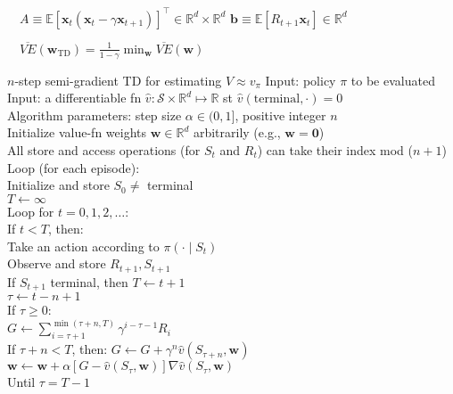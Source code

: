 \documentclass[twocolumn]{article}
\begin{document}
$\quad A \equiv \mathbb E[\mathbf x_t (\mathbf x_t - \gamma \mathbf x_{t+1})]^\top \in \mathbb R^d \times \mathbb R^d$ \hfill $\mathbf b \equiv \mathbb E[R_{t+1} \mathbf x_t] \in \mathbb R^d$

$\quad \overline{VE}(\mathbf w_{\text{TD}}) = \frac{1}{1-\gamma} \min_{\mathbf w} \overline{VE}(\mathbf w)$



\newpage

\begin{mydef}{$n$-step semi-gradient TD for estimating $V \approx v_\pi$}{}
    Input: policy $\pi$ to be evaluated \\
    Input: a differentiable fn $\hat v: \mathcal S \times \mathbb R^d \mapsto \mathbb R$ st $\hat v(\text{terminal}, \cdot) = 0$ \\
    Algorithm parameters: step size $\alpha \in (0, 1]$, positive integer $n$ \\
    Initialize value-fn weights $\mathbf w \in \mathbb R^d$ arbitrarily (e.g., $\mathbf w = \mathbf 0$) \\
    All store and access operations (for $S_t$ and $R_t$) can take their index mod ($n+1$) \\
    
    Loop (for each episode): \\
        \hspace*{2em}Initialize and store $S_0 \neq$ terminal \\
        \hspace*{2em}$T \leftarrow \infty$ \\
        \hspace*{2em}Loop for $t=0,1,2,\dots$: \\
            \hspace*{4em}If $t < T$, then: \\
                \hspace*{6em}Take an action according to $\pi(\cdot \mid S_t)$ \\
                \hspace*{6em}Observe and store $R_{t+1}, S_{t+1}$ \\
                \hspace*{6em}If $S_{t+1}$ terminal, then $T \leftarrow t+1$ \\
            \hspace*{4em}$\tau \leftarrow t-n+1$ \\
            \hspace*{4em}If $\tau \geq 0$: \\
                \hspace*{6em}$G \leftarrow \sum_{i=\tau+1}^{\min (\tau+n, T)} \gamma^{i-\tau-1} R_i$ \\
                \hspace*{6em}If $\tau + n < T$, then: $G \leftarrow G + \gamma^n \hat v(S_{\tau+n}, \mathbf w)$ \\
                \hspace*{6em}$\mathbf w \leftarrow \mathbf w + \alpha [G-\hat v(S_\tau, \mathbf w)] \nabla \hat v(S_\tau, \mathbf w)$ \\
        \hspace*{2em}Until $\tau=T-1$
\end{mydef}
\end{document}
